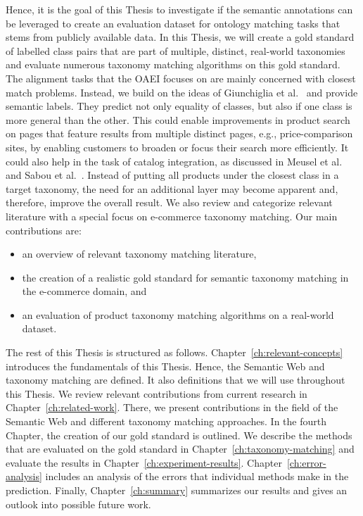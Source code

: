 Hence, it is the goal of this Thesis to investigate if the semantic annotations can be leveraged to create an
evaluation dataset for ontology matching tasks that stems from publicly available data.
In this Thesis, we will create a gold standard of labelled class pairs that are part of multiple,
distinct, real-world taxonomies and evaluate numerous taxonomy matching algorithms on this gold standard.
The alignment tasks that the OAEI focuses on are mainly concerned with closest match problems.
Instead, we build on the ideas of Giunchiglia et al.\@~\cite{giunchiglia2005semantic} and provide semantic labels.
They predict not only equality of classes, but also if one class is more general than the other.
This could enable improvements in product search on pages that feature results from multiple distinct pages,
e.g., price-comparison sites, by enabling customers to broaden or focus their search more efficiently.
It could also help in the task of catalog integration, as discussed in Meusel et al.\@~\cite{meusel2015exploiting}
and Sabou et al.\@~\cite{sabou2008exploring}.
Instead of putting all products under the closest class in a target taxonomy, the need for an additional
layer may become apparent and, therefore, improve the overall result.
We also review and categorize relevant literature with a special focus on e-commerce taxonomy matching.
Our main contributions are:
\begin{itemize}
    \item an overview of relevant taxonomy matching literature,
    \item the creation of a realistic gold standard for semantic taxonomy matching in the e-commerce domain, and
    \item an evaluation of product taxonomy matching algorithms on a real-world dataset.
\end{itemize}

The rest of this Thesis is structured as follows.
Chapter~\ref{ch:relevant-concepts} introduces the fundamentals of this Thesis.
Hence, the Semantic Web and taxonomy matching are defined.
It  also definitions that we will use throughout this Thesis.
We review relevant contributions from current research in Chapter~\ref{ch:related-work}.
There, we present contributions in the field of the Semantic Web and different taxonomy matching approaches.
In the fourth Chapter, the creation of our gold standard is outlined.
We describe the methods that are evaluated on the gold standard in Chapter~\ref{ch:taxonomy-matching}
and evaluate the results in Chapter~\ref{ch:experiment-results}.
Chapter~\ref{ch:error-analysis} includes an analysis of the errors that individual methods make in the prediction.
Finally, Chapter~\ref{ch:summary} summarizes our results and gives an outlook into possible
future work.

